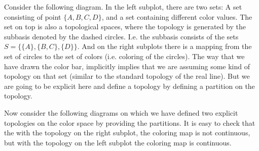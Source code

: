\documentclass[11pt,a4paper]{article}
\theoremstyle{definition}
\theoremstyle{remark}
\begin{document}
	Consider the following diagram. In the left subplot, there are two sets: A set consisting of point $ \{A,B,C,D\} $, and a set containing different color values. The set on top is also a topological spaces, where the topology is generated by the subbasis denoted by the dashed circles. I.e. the subbasis consists of the sets $ S = \{ \{A\}, \{B,C\}, \{D\} \} $. And on the right subplots there is a mapping from the set of circles to the set of colors (i.e. coloring of the circles). The way that we have drawn the color bar, implicitly implies that we are assuming some kind of topology on that set (similar to the standard topology of the real line). But we are going to be explicit here and define a topology by defining a partition on the topology.
	
	
	
	\FloatBarrier
	
	Now consider the following diagrams on which we have defined two explicit topologies on the color space by providing the partitions. It is easy to check that the with the topology on the right subplot, the coloring map is not continuous, but with the topology on the left subplot the coloring map is continuous.
	
	
	
	
	
	
	
\end{document}
